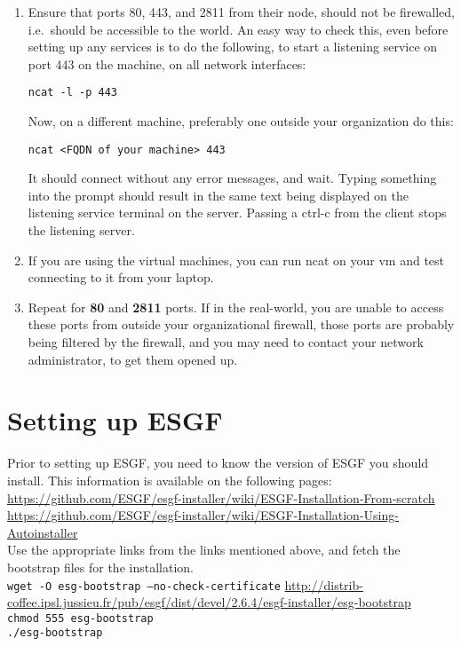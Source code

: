 \begin{enumerate}
\tightlist
\item
  Ensure that ports 80, 443, and 2811 from their node, should not be
  firewalled, i.e.~should be accessible to the world. An easy way to
  check this, even before setting up any services is to do the following, to start a listening service on port 443 on the machine, on all network interfaces:
\begin{verbatim}
ncat -l -p 443
\end{verbatim}
Now, on a different machine, preferably one outside your organization do this:
\begin{verbatim}
ncat <FQDN of your machine> 443
\end{verbatim}
It should connect without any error messages, and wait. Typing something into the prompt should
  result in the same text being displayed on the listening service
  terminal on the server. Passing a ctrl-c from the client stops the
  listening server. 
\item If you are using the virtual machines, you can run ncat on your vm and test connecting to it from your laptop.
\item Repeat for \textbf{80} and \textbf{2811} ports. If in the real-world, you are unable to access these ports from outside your organizational firewall, those ports are probably being filtered by the firewall, and you may need to contact your network administrator, to get them opened up. 
\end{enumerate}

\section{Setting up ESGF}

Prior to setting up ESGF, you need to know the version of ESGF you should install. This information is available on the following pages:\\
\url{https://github.com/ESGF/esgf-installer/wiki/ESGF-Installation-From-scratch}\\
\url{https://github.com/ESGF/esgf-installer/wiki/ESGF-Installation-Using-Autoinstaller}\\

Use the appropriate links from the links mentioned above, and fetch the bootstrap files for the installation.\\
\texttt{wget -O esg-bootstrap --no-check-certificate} \url{http://distrib-coffee.ipsl.jussieu.fr/pub/esgf/dist/devel/2.6.4/esgf-installer/esg-bootstrap}\\
\texttt{chmod 555 esg-bootstrap}\\
\texttt{./esg-bootstrap}

